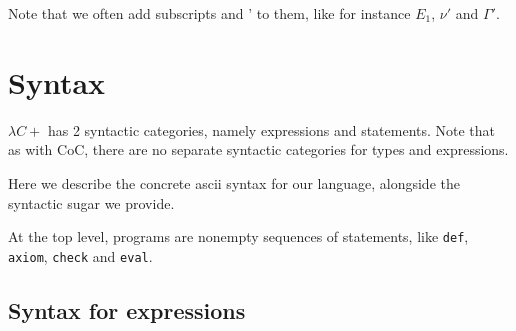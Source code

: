 \documentclass{article}
\begin{document}
Note that we often add subscripts and ' to them, like for instance
$E_1$, $\nu'$ and $\Gamma'$.

\section{Syntax}

$\lambda C+$ has 2 syntactic categories, namely expressions and statements.
Note that as with CoC, there are no separate syntactic categories for types and
expressions.

Here we describe the concrete ascii syntax for our language, alongside
the syntactic sugar we provide.

At the top level, programs are nonempty sequences of statements,
like \texttt{def}, \texttt{axiom}, \texttt{check} and \texttt{eval}.


\subsection{Syntax for expressions}


\end{document}
